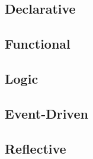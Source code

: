 
\subsection{Declarative}


\subsection{Functional}


\subsection{Logic}


\subsection{Event-Driven}


\subsection{Reflective}

